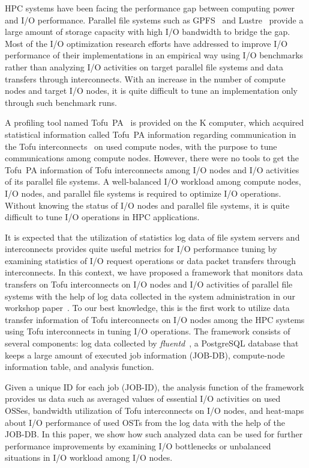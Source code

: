 \documentclass{jhps}
\begin{document}
HPC systems have been facing the performance gap between computing power and I/O performance.
Parallel file systems such as GPFS~\cite{gpfs:usenix02} and Lustre~\cite{lustre:web} provide
a large amount of storage capacity with high I/O bandwidth to bridge the gap.
Most of the I/O optimization research efforts have addressed to improve I/O performance
of their implementations in an empirical way using I/O benchmarks rather than
analyzing I/O activities on target parallel file systems and data transfers through interconnects.
With an increase in the number of compute nodes and target I/O nodes,
it is quite difficult to tune an implementation only through such benchmark runs.

A profiling tool named Tofu~PA~\cite{profiler:fujitsu-tech-si} is provided on the K computer,
which acquired statistical information called Tofu~PA information regarding communication
in the Tofu interconnects~\cite{tofu:micro2012} on used compute nodes, with the purpose
to tune communications among compute nodes.
However, there were no tools to get the Tofu~PA information of Tofu interconnects
among I/O nodes and I/O activities of its parallel file systems.
A well-balanced I/O workload among compute nodes, I/O nodes, and parallel file systems
is required to optimize I/O operations. Without knowing the status of I/O nodes
and parallel file systems, it is quite difficult to tune I/O operations in HPC applications.

It is expected that the utilization of statistics log data of file system servers and
interconnects provides quite useful metrics for I/O performance tuning by examining statistics
of I/O request operations or data packet transfers through interconnects.
In this context, we have proposed a framework that monitors data transfers
on Tofu interconnects on I/O nodes and I/O activities of parallel file systems
with the help of log data collected in the system administration
in our workshop paper~\cite{tsujita:hpc_iodc20}.
To our best knowledge, this is the first work to utilize data transfer information of
Tofu interconnects on I/O nodes among the HPC systems using Tofu interconnects
in tuning I/O operations.
The framework consists of several components: log data collected by
{\itshape fluentd}~\cite{fluentd:web}, a PostgreSQL database that keeps a large amount
of executed job information (JOB-DB),
compute-node information table, and analysis function.

Given a unique ID for each job (JOB-ID), the analysis function of the framework
provides us data such as averaged values of essential I/O activities on used OSSes,
bandwidth utilization of Tofu interconnects on I/O nodes, and heat-maps about
I/O performance of used OSTs from the log data with the help of the JOB-DB.
In this paper, we show how such analyzed data can be used for further performance improvements
by examining I/O bottlenecks or unbalanced situations in I/O workload among I/O nodes.
\end{document}
